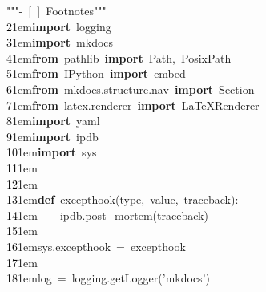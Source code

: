 \documentclass{article}
\newcommand{\codeKeyword}[1]{\textcolor{trac-keyword}{\bfseries #1}}
\newcommand{\codeString}[1]{\textcolor{trac-string}{#1}}
\newcommand{\codeOperator}[1]{\textcolor{trac-operator}{#1}}
\newcommand{\codeBuiltin}[1]{\textcolor{trac-builtin}{#1}}
\newcommand{\codeText}[1]{\textcolor{trac-text}{#1}}
\newcommand{\linenumber}[1]{\textcolor{black}{#1}\kern 1em}
\begin{document}
\parindent=0pt
{ \ttfamily
\codeString{"""\newline{}-\ [\ ]\ Footnotes\newline{}"""}\\
\linenumber{2}\codeKeyword{import}\codeText{\ }\codeText{logging}\\
\linenumber{3}\codeKeyword{import}\codeText{\ }\codeText{mkdocs}\\
\linenumber{4}\codeKeyword{from}\codeText{\ }\codeText{pathlib}\codeText{\ }\codeKeyword{import}\codeText{\ }\codeText{Path}\codeText{,}\codeText{\ }\codeText{PosixPath}\\
\linenumber{5}\codeKeyword{from}\codeText{\ }\codeText{IPython}\codeText{\ }\codeKeyword{import}\codeText{\ }\codeText{embed}\\
\linenumber{6}\codeKeyword{from}\codeText{\ }\codeText{mkdocs}\codeText{.}\codeText{structure}\codeText{.}\codeText{nav}\codeText{\ }\codeKeyword{import}\codeText{\ }\codeText{Section}\\
\linenumber{7}\codeKeyword{from}\codeText{\ }\codeText{latex}\codeText{.}\codeText{renderer}\codeText{\ }\codeKeyword{import}\codeText{\ }\codeText{LaTeXRenderer}\\
\linenumber{8}\codeKeyword{import}\codeText{\ }\codeText{yaml}\\
\linenumber{9}\codeKeyword{import}\codeText{\ }\codeText{ipdb}\\
\linenumber{10}\codeKeyword{import}\codeText{\ }\codeText{sys}\\
\linenumber{11}\\
\linenumber{12}\\
\linenumber{13}\codeKeyword{def}\codeText{\ }\codeText{excepthook}\codeText{(}\codeBuiltin{type}\codeText{,}\codeText{\ }\codeText{value}\codeText{,}\codeText{\ }\codeText{traceback}\codeText{)}\codeText{:}\\
\linenumber{14}\codeText{\ \ \ \ }\codeText{ipdb}\codeOperator{.}\codeText{post\_mortem}\codeText{(}\codeText{traceback}\codeText{)}\\
\linenumber{15}\\
\linenumber{16}\codeText{sys}\codeOperator{.}\codeText{excepthook}\codeText{\ }\codeOperator{=}\codeText{\ }\codeText{excepthook}\\
\linenumber{17}\\
\linenumber{18}\codeText{log}\codeText{\ }\codeOperator{=}\codeText{\ }\codeText{logging}\codeOperator{.}\codeText{getLogger}\codeText{(}\codeString{'}\codeString{mkdocs}\codeString{'}\codeText{)}\\
}
\end{document}
